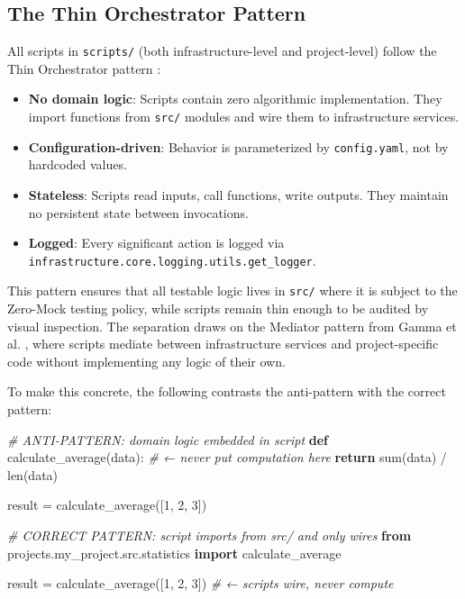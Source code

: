 \documentclass[
]{article}
\newenvironment{Shaded}{}{}
\newcommand{\BuiltInTok}[1]{\textcolor[rgb]{0.00,0.50,0.00}{#1}}
\newcommand{\CommentTok}[1]{\textcolor[rgb]{0.38,0.63,0.69}{\textit{#1}}}
\newcommand{\ControlFlowTok}[1]{\textcolor[rgb]{0.00,0.44,0.13}{\textbf{#1}}}
\newcommand{\DecValTok}[1]{\textcolor[rgb]{0.25,0.63,0.44}{#1}}
\newcommand{\ImportTok}[1]{\textcolor[rgb]{0.00,0.50,0.00}{\textbf{#1}}}
\newcommand{\KeywordTok}[1]{\textcolor[rgb]{0.00,0.44,0.13}{\textbf{#1}}}
\newcommand{\NormalTok}[1]{#1}
\newcommand{\OperatorTok}[1]{\textcolor[rgb]{0.40,0.40,0.40}{#1}}
\providecommand{\tightlist}{%
  \setlength{\itemsep}{0pt}\setlength{\parskip}{0pt}}
\begin{document}
\subsection{The Thin Orchestrator
Pattern}\label{the-thin-orchestrator-pattern}

All scripts in \texttt{scripts/} (both infrastructure-level and
project-level) follow the Thin Orchestrator pattern
\citep{gamma1995design}:

\begin{itemize}
\tightlist
\item
  \textbf{No domain logic}: Scripts contain zero algorithmic
  implementation. They import functions from \texttt{src/} modules and
  wire them to infrastructure services.
\item
  \textbf{Configuration-driven}: Behavior is parameterized by
  \texttt{config.yaml}, not by hardcoded values.
\item
  \textbf{Stateless}: Scripts read inputs, call functions, write
  outputs. They maintain no persistent state between invocations.
\item
  \textbf{Logged}: Every significant action is logged via
  \texttt{infrastructure.core.logging.utils.get\_logger}.
\end{itemize}

This pattern ensures that all testable logic lives in \texttt{src/}
where it is subject to the Zero-Mock testing policy, while scripts
remain thin enough to be audited by visual inspection. The separation
draws on the Mediator pattern from Gamma et al. \citep{gamma1995design},
where scripts mediate between infrastructure services and
project-specific code without implementing any logic of their own.

To make this concrete, the following contrasts the anti-pattern with the
correct pattern:

\begin{Shaded}
\begin{Highlighting}[]
\CommentTok{\# ANTI{-}PATTERN: domain logic embedded in script}
\KeywordTok{def}\NormalTok{ calculate\_average(data):          }\CommentTok{\# ← never put computation here}
    \ControlFlowTok{return} \BuiltInTok{sum}\NormalTok{(data) }\OperatorTok{/} \BuiltInTok{len}\NormalTok{(data)}

\NormalTok{result }\OperatorTok{=}\NormalTok{ calculate\_average([}\DecValTok{1}\NormalTok{, }\DecValTok{2}\NormalTok{, }\DecValTok{3}\NormalTok{])}

\CommentTok{\# CORRECT PATTERN: script imports from src/ and only wires}
\ImportTok{from}\NormalTok{ projects.my\_project.src.statistics }\ImportTok{import}\NormalTok{ calculate\_average}

\NormalTok{result }\OperatorTok{=}\NormalTok{ calculate\_average([}\DecValTok{1}\NormalTok{, }\DecValTok{2}\NormalTok{, }\DecValTok{3}\NormalTok{])  }\CommentTok{\# ← scripts wire, never compute}
\end{Highlighting}
\end{Shaded}
\end{document}
